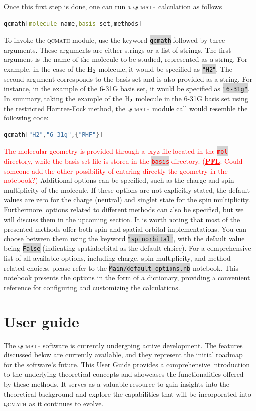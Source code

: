 \documentclass[aip,jcp,reprint,noshowkeys,superscriptaddress]{revtex4-1}
\newcommand{\titou}[1]{\textcolor{red}{#1}}
\newcommand{\PFL}[1]{\titou{(\underline{\bf PFL}: #1)}}
\newcommand{\qcmath}{\textsc{qcmath}\xspace}
\newcommand{\keyword}[1]{{\colorbox{lightgray}{\texttt{#1}}}}
\begin{document}
Once this first step is done, one can run a \qcmath calculation as follows
\begin{lstlisting}[extendedchars=true,language=Mathematica]
	qcmath[molecule_name,basis_set,methods]
\end{lstlisting}
To invoke the \qcmath module, use the keyword \keyword{qcmath} followed by three arguments. These arguments are either strings or a list of strings. The first argument is the name of the molecule to be studied, represented as a string. For example, in the case of the $\ce{H2}$ molecule, it would be specified as \keyword{"H2"}. The second argument corresponds to the basis set and is also provided as a string. For instance, in the example of the 6-31G basis set, it would be specified as \keyword{"6-31g"}. In summary, taking the example of the $\ce{H2}$ molecule in the 6-31G basis set using the restricted Hartree-Fock method, the \qcmath module call would resemble the following code:
\begin{lstlisting}[extendedchars=true,language=Mathematica]
	qcmath["H2","6-31g",{"RHF"}]
\end{lstlisting}
\titou{The molecular geometry is provided through a .xyz file located in the \keyword{mol} directory, while the basis set file is stored in the \keyword{basis} directory.} 
\PFL{Could someone add the other possibility of entering directly the geometry in the notebook?}
Additional options can be specified, such as the charge and spin multiplicity of the molecule. If these options are not explicitly stated, the default values are zero for the charge (neutral) and singlet state for the spin multiplicity.
Furthermore, options related to different methods can also be specified, but we will discuss them in the upcoming section. It is worth noting that most of the presented methods offer both spin and spatial orbital implementations. You can choose between them using the keyword \keyword{"spinorbital"}, with the default value being \keyword{False} (indicating spatialorbital as the default choice).
For a comprehensive list of all available options, including charge, spin multiplicity, and method-related choices, please refer to the \keyword{Main/default\_options.nb} notebook. This notebook presents the options in the form of a dictionary, providing a convenient reference for configuring and customizing the calculations.

\section{User guide}
The \qcmath software is currently undergoing active development. The features discussed below are currently available, and they represent the initial roadmap for the software's future. This User Guide provides a comprehensive introduction to the underlying theoretical concepts and showcases the functionalities offered by these methods. \cite{SzaboBook,JensenBook,HelgakerBook,MartinBook,FetterBook} It serves as a valuable resource to gain insights into the theoretical background and explore the capabilities that will be incorporated into \qcmath as it continues to evolve.
\end{document}
